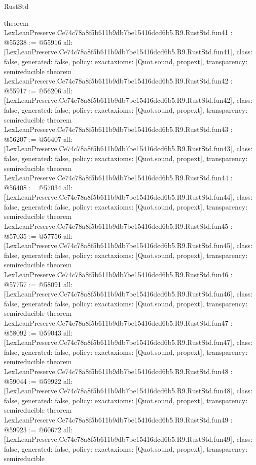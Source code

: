 \begin{lexlean}{RustStd}
\begin{coremodule}
{}
theorem LexLeanPreserve.Ce74c78a8f5b611b9db7be15416dcd6b5.R9.RustStd.fun41 : @55238 := @55916 {
  all: [LexLeanPreserve.Ce74c78a8f5b611b9db7be15416dcd6b5.R9.RustStd.fun41],
  class: false,
  generated: false,
  policy: exact{axioms: [Quot.sound, propext]},
  transparency: semireducible
}
theorem LexLeanPreserve.Ce74c78a8f5b611b9db7be15416dcd6b5.R9.RustStd.fun42 : @55917 := @56206 {
  all: [LexLeanPreserve.Ce74c78a8f5b611b9db7be15416dcd6b5.R9.RustStd.fun42],
  class: false,
  generated: false,
  policy: exact{axioms: [Quot.sound, propext]},
  transparency: semireducible
}
theorem LexLeanPreserve.Ce74c78a8f5b611b9db7be15416dcd6b5.R9.RustStd.fun43 : @56207 := @56407 {
  all: [LexLeanPreserve.Ce74c78a8f5b611b9db7be15416dcd6b5.R9.RustStd.fun43],
  class: false,
  generated: false,
  policy: exact{axioms: [Quot.sound, propext]},
  transparency: semireducible
}
theorem LexLeanPreserve.Ce74c78a8f5b611b9db7be15416dcd6b5.R9.RustStd.fun44 : @56408 := @57034 {
  all: [LexLeanPreserve.Ce74c78a8f5b611b9db7be15416dcd6b5.R9.RustStd.fun44],
  class: false,
  generated: false,
  policy: exact{axioms: [Quot.sound, propext]},
  transparency: semireducible
}
theorem LexLeanPreserve.Ce74c78a8f5b611b9db7be15416dcd6b5.R9.RustStd.fun45 : @57035 := @57756 {
  all: [LexLeanPreserve.Ce74c78a8f5b611b9db7be15416dcd6b5.R9.RustStd.fun45],
  class: false,
  generated: false,
  policy: exact{axioms: [Quot.sound, propext]},
  transparency: semireducible
}
theorem LexLeanPreserve.Ce74c78a8f5b611b9db7be15416dcd6b5.R9.RustStd.fun46 : @57757 := @58091 {
  all: [LexLeanPreserve.Ce74c78a8f5b611b9db7be15416dcd6b5.R9.RustStd.fun46],
  class: false,
  generated: false,
  policy: exact{axioms: [Quot.sound, propext]},
  transparency: semireducible
}
theorem LexLeanPreserve.Ce74c78a8f5b611b9db7be15416dcd6b5.R9.RustStd.fun47 : @58092 := @59043 {
  all: [LexLeanPreserve.Ce74c78a8f5b611b9db7be15416dcd6b5.R9.RustStd.fun47],
  class: false,
  generated: false,
  policy: exact{axioms: [Quot.sound, propext]},
  transparency: semireducible
}
theorem LexLeanPreserve.Ce74c78a8f5b611b9db7be15416dcd6b5.R9.RustStd.fun48 : @59044 := @59922 {
  all: [LexLeanPreserve.Ce74c78a8f5b611b9db7be15416dcd6b5.R9.RustStd.fun48],
  class: false,
  generated: false,
  policy: exact{axioms: [Quot.sound, propext]},
  transparency: semireducible
}
theorem LexLeanPreserve.Ce74c78a8f5b611b9db7be15416dcd6b5.R9.RustStd.fun49 : @59923 := @60672 {
  all: [LexLeanPreserve.Ce74c78a8f5b611b9db7be15416dcd6b5.R9.RustStd.fun49],
  class: false,
  generated: false,
  policy: exact{axioms: [Quot.sound, propext]},
  transparency: semireducible
}
\end{coremodule}
\end{lexlean}
